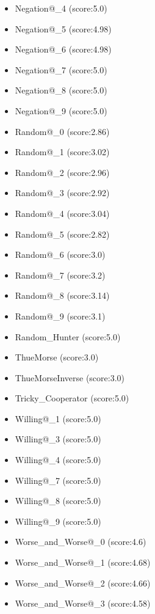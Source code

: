 \begin{appendices}
\begin{itemize}
\begin{multicols}{3}
\begin{itemize}
                \item Negation@\_4 (score:5.0)
                \item Negation@\_5 (score:4.98)
                \item Negation@\_6 (score:4.98)
                \item Negation@\_7 (score:5.0)
                \item Negation@\_8 (score:5.0)
                \item Negation@\_9 (score:5.0)
                \item Random@\_0 (score:2.86)
                \item Random@\_1 (score:3.02)
                \item Random@\_2 (score:2.96)
                \item Random@\_3 (score:2.92)
                \item Random@\_4 (score:3.04)
                \item Random@\_5 (score:2.82)
                \item Random@\_6 (score:3.0)
                \item Random@\_7 (score:3.2)
                \item Random@\_8 (score:3.14)
                \item Random@\_9 (score:3.1)
                \item Random\_Hunter (score:5.0)
                \item ThueMorse (score:3.0)
                \item ThueMorseInverse (score:3.0)
                \item Tricky\_Cooperator (score:5.0)
                \item Willing@\_1 (score:5.0)
                \item Willing@\_3 (score:5.0)
                \item Willing@\_4 (score:5.0)
                \item Willing@\_7 (score:5.0)
                \item Willing@\_8 (score:5.0)
                \item Willing@\_9 (score:5.0)
                \item Worse\_and\_Worse@\_0 (score:4.6)
                \item Worse\_and\_Worse@\_1 (score:4.68)
                \item Worse\_and\_Worse@\_2 (score:4.66)
                \item Worse\_and\_Worse@\_3 (score:4.58)

\end{itemize}
\end{multicols}
\end{itemize}
\end{appendices}

